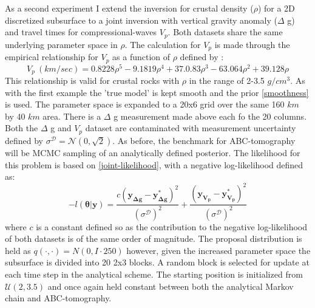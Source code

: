 As a second experiment I extend the inversion for crustal density ($\rho$) for a 2D discretized subsurface to a joint inversion with vertical gravity anomaly ($\Delta$ g) and travel times for compressional-waves $V_p$. Both datasets share the same underlying parameter space in $\rho$. The calculation for $V_p$ is made through the empirical relationship for $V_p$ as a function of $\rho$ defined by \citet{Brocher2005}:
\begin{equation}
	V_p\ (km/sec) = 0.8228\rho^5 - 9.1819\rho^4 + 37.0.83\rho^3 - 63.064\rho^2 + 39.128\rho
	\label{rhotovp}
\end{equation}
This relationship is valid for crustal rocks with $\rho$ in the range of 2-3.5 $g/cm^3$. As with the first example the 'true model' is kept smooth and the prior \ref{smoothness} is used. The parameter space is expanded to a 20x6 grid over the same 160 $km$ by 40 $km$ area. There is a $\Delta$ g measurement made above each fo the 20 columns. Both the $\Delta$ g and $V_p$ dataset are contaminated with measurement uncertainty defined by $\sigma^{\mathcal{D}} = \mathcal{N}(0,\sqrt{2})$. As before, the benchmark for ABC-tomography will be MCMC sampling of an analytically defined posterior. The likelihood for this problem is based on \ref{joint-likelihood}, with a negative log-likelihood defined as:
\begin{equation}
	-l(\bm{\theta}|\bm{y}) = \frac{c(\bm{y_{\Delta g}}-\bm{y^*_{\Delta g}})^2}{(\sigma^{\mathcal{D}})^2} + \frac{(\bm{y_{V_p}}-\bm{y^*_{V_p}})^2}{(\sigma^{\mathcal{D}})^2}
\end{equation}
where $c$ is a constant defined so as the contribution to the negative log-likelihood of both datasets is of the same order of magnitude. The proposal distribution is held as $q(\cdot,\cdot) = N(0,I\cdot250)$ however, given the increased parameter space the subsurface is divided into 20 2x3 blocks. A random block is selected for update at each time step in the analytical scheme. The starting position is initialized from $\mathcal{U}(2,3.5)$  and once again held constant between both the analytical Markov chain and ABC-tomography. \par

